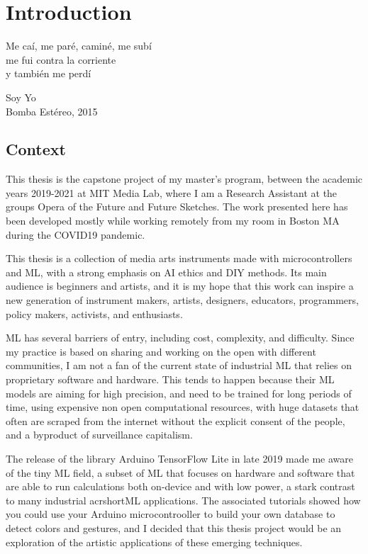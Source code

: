 \chapter{Introduction}

\epigraph{Me caí, me paré, caminé, me subí \\ me fui contra la corriente \\ y también me perdí}{Soy Yo \\ Bomba Estéreo, 2015}

\section{Context}

This thesis is the capstone project of my master's program, between the academic years 2019-2021 at MIT Media Lab, where I am a Research Assistant at the groups Opera of the Future and Future Sketches. The work presented here has been developed mostly while working remotely from my room in Boston MA during the COVID19 pandemic.

This thesis is a collection of media arts instruments made with microcontrollers and \acrfull{ML}, with a strong emphasis on \acrfull{AI} ethics and \acrfull{DIY} methods. Its main audience is beginners and artists, and it is my hope that this work can inspire a new generation of instrument makers, artists, designers, educators, programmers, policy makers, activists, and enthusiasts.

\acrshort{ML} has several barriers of entry, including cost, complexity, and difficulty. Since my practice is based on sharing and working on the open with different communities, I am not a fan of the current state of industrial \acrshort{ML} that relies on proprietary software and hardware. This tends to happen because their ML models are aiming for high precision, and need to be trained for long periods of time, using expensive non open computational resources, with huge datasets that often are scraped from the internet without the explicit consent of the people, and a byproduct of surveillance capitalism.

The release of the library Arduino TensorFlow Lite in late 2019 made me aware of the tiny \acrshort{ML} field, a subset of \acrshort{ML} that focuses on hardware and software that are able to run calculations both on-device and with low power, a stark contrast to many industrial acrshort{ML} applications. The associated tutorials showed how you could use your Arduino microcontrooller to build your own database to detect colors and gestures, and I decided that this thesis project would be an exploration of the artistic applications of these emerging techniques. 

